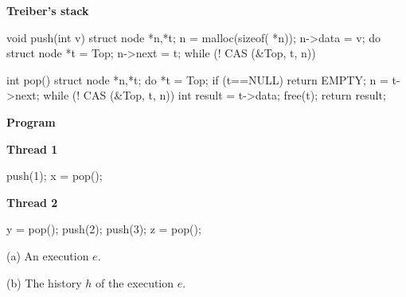 \begin{figure*}[t]
  \lstset{numbers=left, 
          numberstyle=\tiny\tt, 
          stepnumber=1, 
          firstnumber=1,
          numbersep=4pt}
  \footnotesize
    \lstset{numbers=none}
  \begin{minipage}[c]{50mm}
    {\normalsize \textbf{Treiber's stack}}
    \begin{program}
void push(int v) {
  struct node *n,*t;
  n = malloc(sizeof( *n));
  n->data = v;
  do {
    struct node *t = Top;
    n->next = t;
  } while (! CAS (&Top, t, n))
}

int pop() {
  struct node *n,*t;
  do {
    *t = Top;
    if (t==NULL)
      return EMPTY;
    n = t->next;
  } while (! CAS (&Top, t, n))
  int result = t->data;
  free(t);
  return result;
}
    \end{program}
    {\normalsize\bf Program} \\[1mm]
    \begin{minipage}[b]{17mm}
      \textbf{Thread 1}
      \begin{program}
push(1);
x = pop();
      \end{program}
      \vspace{6.3mm}
    \end{minipage}
    \begin{minipage}[b]{16mm}
      \textbf{Thread 2}
      \begin{program}
y = pop();
push(2);
push(3);
z = pop();
      \end{program}
    \end{minipage}
  \end{minipage}
  \begin{minipage}[c]{120mm}

    
    
    \vspace{-2mm}
    \hspace{5cm}(a) An execution $e$.
    
    \smallskip
    
    
     \smallskip
    \hspace{5cm}(b) The history $h$ of the execution $e$.
    
     \smallskip
    
    

\end{minipage}
\end{figure*}
